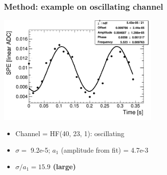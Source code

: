 \documentclass[bigger]{beamer}
\providecommand{\alert}[1]{\textbf{#1}}
\begin{document}
\begin{frame}
\frametitle{Method: example on oscillating channel}
\label{sec-2-1-6}
\label{sec-2-1-6-1}

\centering
\includegraphics[width=0.6\textwidth]{fig/fit_output_ieta40_iphi23_depth1.png}
\begin{itemize}

\item Channel = HF(40, 23, 1): oscillating
\label{sec-2-1-6-2}%

\item $\sigma =$ 9.2e-5; $a_{1}$ (amplitude from fit) = 4.7e-3
\label{sec-2-1-6-3}%

\item \alert{$\sigma / a_{1} = 15.9$ (large)}
\label{sec-2-1-6-4}%
\end{itemize} %
\end{frame}
\end{document}
